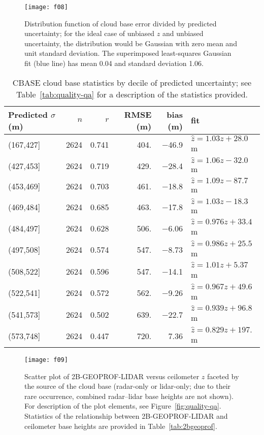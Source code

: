 \documentclass[essd,manuscript]{copernicus}
\begin{document}
\begin{figure}
{\centering \texttt{[image: f08]}

}
  \caption{Distribution function of cloud base error divided by predicted
    uncertainty; for the ideal case of unbiased \ensuremath{z}{} and unbiased
    uncertainty, the distribution would be Gaussian with zero mean and unit
    standard deviation.  The superimposed least-squares Gaussian fit (blue line)
    has mean 0.04 and
    standard deviation 1.06.}
  \label{fig:pull}
\end{figure}

\begin{table*}[t]
  \centering
  \caption{CBASE cloud base statistics by decile of predicted uncertainty; see
    Table~\ref{tab:quality-qa} for a description of the 
    statistics provided.}
  \label{tab:rmseclass}

\begin{tabular}{lrrrrl}
  \hline
\hline
Predicted $\sigma$ (m) & $n$ & $r$ & RMSE (m) & bias (m) & fit \\ 
  \hline
(167,427] & 2624 & 0.741 & 404. & $-$46.9 & $\hat{z} = 1.03 z + 28.0$ m \\ 
  (427,453] & 2624 & 0.719 & 429. & $-$28.4 & $\hat{z} = 1.06 z - 32.0$ m \\ 
  (453,469] & 2624 & 0.703 & 461. & $-$18.8 & $\hat{z} = 1.09 z - 87.7$ m \\ 
  (469,484] & 2624 & 0.685 & 463. & $-$17.8 & $\hat{z} = 1.03 z - 18.3$ m \\ 
  (484,497] & 2624 & 0.628 & 506. & $-$6.06 & $\hat{z} = 0.976 z + 33.4$ m \\ 
  (497,508] & 2624 & 0.574 & 547. & $-$8.73 & $\hat{z} = 0.986 z + 25.5$ m \\ 
  (508,522] & 2624 & 0.596 & 547. & $-$14.1 & $\hat{z} = 1.01 z + 5.37$ m \\ 
  (522,541] & 2624 & 0.572 & 562. & $-$9.26 & $\hat{z} = 0.967 z + 49.6$ m \\ 
  (541,573] & 2624 & 0.502 & 639. & $-$22.7 & $\hat{z} = 0.939 z + 96.8$ m \\ 
  (573,748] & 2624 & 0.447 & 720. & 7.36 & $\hat{z} = 0.829 z + 197.$ m \\ 
   \hline
\hline
\end{tabular}

\end{table*}

\begin{figure*}
{\centering \texttt{[image: f09]}

}
  \caption{Scatter plot of 2B-GEOPROF-LIDAR versus ceilometer \ensuremath{z}{}
    faceted by the source of the cloud base (radar-only or lidar-only; due to
    their rare occurrence, combined radar--lidar base heights are not shown).
    For description of the plot elements, see Figure~\ref{fig:quality-qa}.  Statistics of the
    relationship between 2B-GEOPROF-LIDAR and ceilometer base heights are provided in
    Table~\ref{tab:2bgeoprof}.}
  \label{fig:eval-2b}
\end{figure*}
\end{document}
